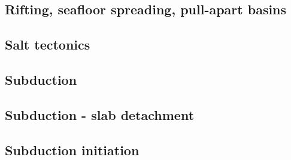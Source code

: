 \subsection*{Rifting, seafloor spreading, pull-apart basins}

\cite{hoen86b}
\cite{zieg92b}
\cite{dusa96}
\cite{rafm98}
\cite{hupc01}
\cite{hube02}\cite{hani02}\cite{dabm02}
\cite{hube03}\cite{hani03}
\cite{hier04}
\cite{hubb05}
\cite{huha07}
\cite{agcz09}
\cite{aubh10}
\cite{alht11}
\cite{alht12}
\cite{alhf13}
\cite{hebr14}\cite{lige14}
\cite{nabu15}
\cite{olbm16}\cite{jekm16}
\cite{lemh17}

\subsection*{Salt tectonics}

\cite{zaju92}
\cite{nabr93}
\cite{istt04}
\cite{huja07}

\subsection*{Subduction}

\cite{jarr86}
\cite{hstt90}
\cite{zhgu92}
\cite{jope93}\cite{dvnm93}
\cite{zhgu94}
\cite{hajc97}
\cite{itki98}
\cite{hagu99}
\cite{refm03}
\cite{jalo05}\cite{lahb05}
\cite{degw06}\cite{rohu06}
\cite{artd07}\cite{yaab07}
\cite{yaba08}\cite{ozrs08}\cite{dihf08}
\cite{yahb09}
\cite{hagr10}
\cite{lobh10}
\cite{lixg11}\cite{list11}
\cite{anwb12}\cite{jahu12}\cite{jabi12}\cite{jabk12}\cite{lixg12}\cite{lixg13}\cite{ronb12}
\cite{nabg13}\cite{hage13}\cite{ancv13}\cite{namu13}\cite{yosh13}\cite{zhgt13}\cite{jabr13}\cite{izht13}
\cite{luws13}\cite{dusc13}
\cite{robn14}\cite{hond14}\cite{ronc14}

\subsection*{Subduction - slab detachment}

\cite{yowo95}
\cite{desw98}
\cite{anbi09}
\cite{dugm11}
\cite{dugk12}
\cite{dusg12}
\cite{dugs14}

\subsection*{Subduction initiation}

